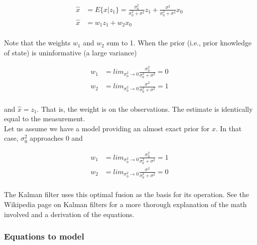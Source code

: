 \documentclass[10pt,conference,compsoc]{IEEEtran}
\begin{document}
\begin{align}
  \hat{x} &= E\{x|z_1\} = \frac{\sigma_0^2}{\sigma_0^2 + \sigma^2}z_1 +
    \frac{\sigma^2}{\sigma_0^2 + \sigma^2}x_0 \\
  \hat{x} &= w_1 z_1 + w_2 x_0 \nonumber
\end{align}
\\
\noindent Note that the weights $w_1$ and $w_2$ sum to 1. When the prior (i.e.,
prior knowledge of state) is uninformative (a large variance)

\begin{align}
  w_1 &= lim_{\sigma_0^2 \to 0} \frac{\sigma_0^2}{\sigma_0^2 + \sigma^2} = 0 \\
  w_2 &= lim_{\sigma_0^2 \to 0} \frac{\sigma^2}{\sigma_0^2 + \sigma^2} = 1
\end{align}
\\
\noindent and $\hat{x} = z_1$. That is, the weight is on the observations. The
estimate is identically equal to the measurement. \\

\noindent Let us assume we have a model providing an almost exact prior for $x$.
In that case, $\sigma_0^2$ approaches 0 and

\begin{align}
  w_1 &= lim_{\sigma_0^2 \to 0} \frac{\sigma_0^2}{\sigma_0^2 + \sigma^2} = 1 \\
  w_2 &= lim_{\sigma_0^2 \to 0} \frac{\sigma^2}{\sigma_0^2 + \sigma^2} = 0
\end{align}
\\
\noindent The Kalman filter uses this optimal fusion as the basis for its
operation. See the Wikipedia page on Kalman filters \cite{bib:kalman_filter} for
a more thorough explanation of the math involved and a derivation of the
equations.

\subsubsection{Equations to model}
\end{document}

